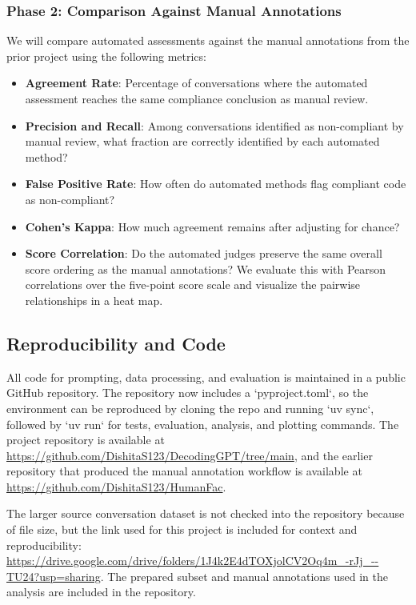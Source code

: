 \documentclass[12pt]{article}
\begin{document}
\subsubsection{Phase 2: Comparison Against Manual Annotations}
 
We will compare automated assessments against the manual annotations from the prior project using the following metrics:
 
\begin{itemize}
    \item \textbf{Agreement Rate}: Percentage of conversations where the automated assessment reaches the same compliance conclusion as manual review.
    \item \textbf{Precision and Recall}: Among conversations identified as non-compliant by manual review, what fraction are correctly identified by each automated method?
    \item \textbf{False Positive Rate}: How often do automated methods flag compliant code as non-compliant?
    \item \textbf{Cohen's Kappa}: How much agreement remains after adjusting for chance?
    \item \textbf{Score Correlation}: Do the automated judges preserve the same overall score ordering as the manual annotations? We evaluate this with Pearson correlations over the five-point score scale and visualize the pairwise relationships in a heat map.
\end{itemize}
 
 
\subsection{Reproducibility and Code}
 
All code for prompting, data processing, and evaluation is maintained in a public GitHub repository. The repository now includes a `pyproject.toml`, so the environment can be reproduced by cloning the repo and running `uv sync`, followed by `uv run` for tests, evaluation, analysis, and plotting commands. The project repository is available at \url{https://github.com/DishitaS123/DecodingGPT/tree/main}, and the earlier repository that produced the manual annotation workflow is available at \url{https://github.com/DishitaS123/HumanFac}.

The larger source conversation dataset is not checked into the repository because of file size, but the link used for this project is included for context and reproducibility: \url{https://drive.google.com/drive/folders/1J4k2E4dTOXjolCV2Oq4m_-rJj_--TU24?usp=sharing}. The prepared subset and manual annotations used in the analysis are included in the repository.
 
\end{document}
